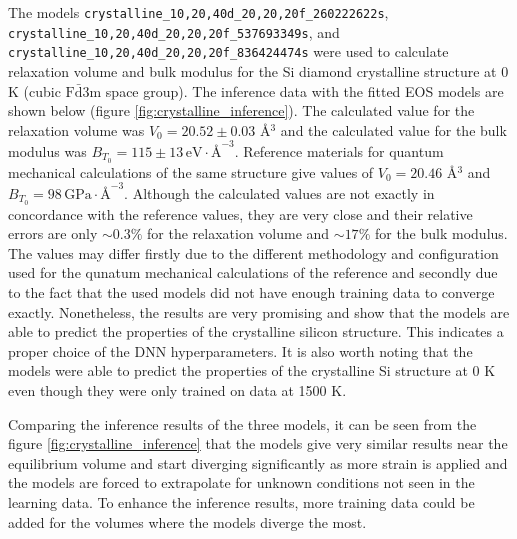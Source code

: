The models \texttt{crystalline\_10,20,40d\_20,20,20f\_260222622s},
\texttt{cryst\-alline\_10,20,40d\_20,20,20f\_537693349s}, and
\texttt{crystalline\_10,20,\linebreak{}40d\_20,20,20f\_836424474s} were used to calculate
relaxation volume and bulk modulus for the Si diamond crystalline structure
at 0 K (cubic $\mathrm{F}\bar{\mathrm{d}}\mathrm{3m}$ space group). The
inference data with the fitted EOS models are shown below (figure
\ref{fig:crystalline_inference}). The calculated value for the relaxation
volume was $V_0 = 20.52 \pm 0.03$ \AA$^3$ and the calculated value for the
bulk modulus was
$B_{T_0} = 115 \pm 13 \, \mathrm{eV} \cdot \text{\AA}^{-3}$. Reference
materials for quantum mechanical calculations of the same structure give
values of $V_0 = 20.46$ \AA$^3$ and
$B_{T_0} = 98 \, \mathrm{GPa} \cdot \text{\AA}^{-3}$\cite{osti_1190959}.
Although the calculated values are not exactly in concordance with the
reference values, they are very close and their relative errors are
only $\sim 0.3\%$ for the relaxation volume and $\sim 17 \%$ for the bulk
modulus. The values may differ firstly due to the different methodology and
configuration used for the qunatum mechanical calculations of the reference
and secondly due to the fact that the used models did not have enough training
data to converge exactly. Nonetheless, the results are very promising and show
that the models are able to predict the properties of the crystalline silicon
structure. This indicates a proper choice of the DNN hyperparameters. It is
also worth noting that the models were able to predict the properties of the
crystalline Si structure at 0 K even though they were only trained on data at
1500 K.

Comparing the inference results of the three models, it can be seen from the
figure \ref{fig:crystalline_inference} that the models give very similar
results near the equilibrium volume and start diverging significantly as more
strain is applied and the models are forced to extrapolate for unknown
conditions not seen in the learning data. To enhance the inference results,
more training data could be added for the volumes where the models diverge the
most.

